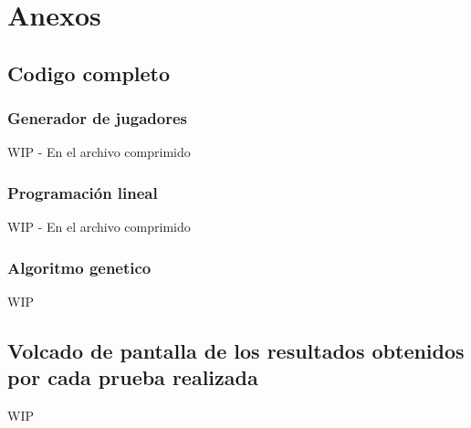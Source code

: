 \documentclass[a4paper,12pt]{article}
\begin{document}
\section{Anexos}
\subsection{Codigo completo}
\subsubsection{Generador de jugadores}
WIP - En el archivo comprimido
\subsubsection{Programación lineal}
WIP - En el archivo comprimido
\subsubsection{Algoritmo genetico}
WIP



\subsection{Volcado de pantalla de los resultados obtenidos por cada prueba realizada}
WIP
\end{document}
